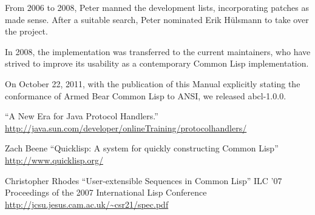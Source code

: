 \documentclass[10pt]{book}
\begin{document}
From 2006 to 2008, Peter manned the development lists, incorporating
patches as made sense.  After a suitable search, Peter nominated Erik
H\"{u}lsmann to take over the project.

In 2008, the implementation was transferred to the current
maintainers, who have strived to improve its usability as a
contemporary Common Lisp implementation.

On October 22, 2011, with the publication of this Manual explicitly
stating the conformance of Armed Bear Common Lisp to \textsc{ANSI}, we released
abcl-1.0.0.



\begin{thebibliography}{9}

\label{_:1}
  ``A New Era for Java Protocol Handlers.''
  \url{http://java.sun.com/developer/onlineTraining/protocolhandlers/}

\label{_:XACH2011}
  Zach Beene
  ``Quicklisp:  A system for quickly constructing Common Lisp''
  \url{http://www.quicklisp.org/}

Christopher Rhodes
``User-extensible Sequences in Common Lisp''
ILC '07 Proceedings of the 2007 International Lisp Conference
\url{http://jcsu.jesus.cam.ac.uk/~csr21/spec.pdf}

\end{thebibliography}

\printindex
\end{document}

